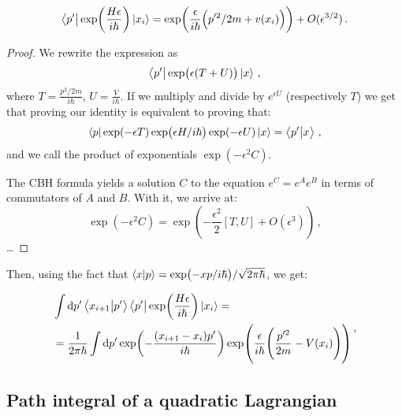 \documentclass[main.tex]{subfiles}
\begin{document}
\begin{claim}
\begin{equation}
  \bra{p'} 
  \exp(\frac{H \epsilon }{i \hbar}) \ket{x_i}
  = \exp(\frac{\epsilon }{i \hbar} \qty(p^{\prime 2}/2m + v(x_{i}))) + O(\epsilon^{3/2})
\,.
\end{equation}
\end{claim}

\begin{proof}
  We rewrite the expression as 
  \begin{equation}
    \bra{p^{\prime }} \exp(\epsilon (T+U)) \ket{x}  
  \,,
  \end{equation}
  where \(T = \frac{p^2/2m}{ i \hbar} \), \(U = \frac{V}{i \hbar}\).
  If we multiply and divide by \(e^{\epsilon U}\) (respectively \(T\)) we get that proving our identity is equivalent to proving that: 
  \begin{equation}
    \bra{p} \exp(-\epsilon T) \exp(\epsilon H / i \hbar) \exp(-\epsilon U) \ket{x}  = \braket{p'}{x} 
  \,,
  \end{equation}
  and we call the product of exponentials \(\exp(-\epsilon^2 C) \).

  The CBH formula yields a solution \(C\) to the equation \(e^{C}= e^{A}e^{B}\) in terms of commutators of \(A\) and \(B\).
  With it, we arrive at:  
  \begin{equation}
    \exp(-\epsilon^2 C) = \exp(- \frac{\epsilon^2}{2} [T, U] + O(\epsilon^3)) 
  \,,
  \end{equation}
  \dots
\end{proof}

Then, using the fact that \(\braket{x}{p} = \exp(-xp/i\hbar) / \sqrt{2 \pi \hbar} \), we get: 


%
\begin{subequations}
\begin{align}
  &\int  \dd{p'} \braket{x_{i+1}}{p'} \bra{p'} 
  \exp(\frac{H \epsilon }{i \hbar}) \ket{x_i} =  \\
  &= \frac{1}{2 \pi \hbar} \int  \dd{p^{\prime }} 
  \exp(-\frac{\qty(x_{i+1}-x_{i})p^{\prime }}{i \hbar}) 
  \exp(\frac{\epsilon }{i \hbar}\qty(\frac{p^{\prime 2}}{2m} - V(x_{i}))) 
\end{align}
\,,
\end{subequations}

\subsection{Path integral of a quadratic Lagrangian}
\end{document}
